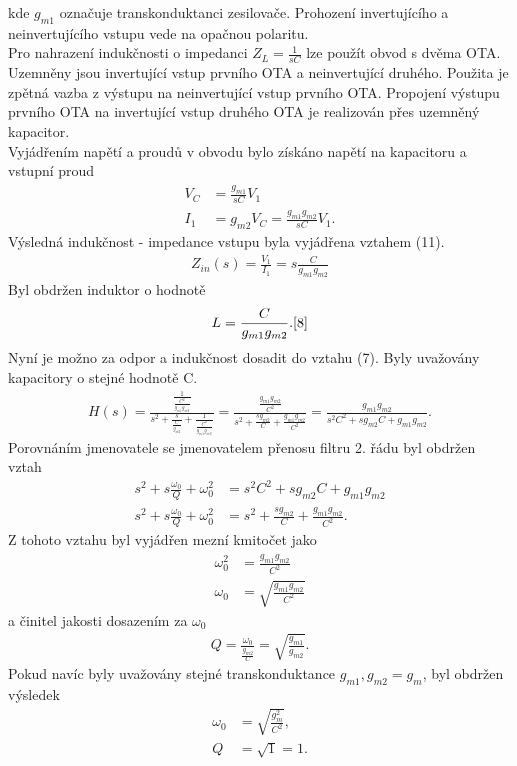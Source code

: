 \documentclass[twoside]{article}
\begin{document}
kde $g_{m1}$ označuje transkonduktanci zesilovače. Prohození invertujícího a neinvertujícího vstupu vede na opačnou polaritu. \cite{8} \\
Pro nahrazení indukčnosti o impedanci $Z_L = \frac{1}{sC}$ lze použít obvod s dvěma OTA. Uzemněny jsou invertující vstup prvního OTA a neinvertující druhého. Použita je zpětná vazba z výstupu na neinvertující vstup prvního OTA. Propojení výstupu prvního OTA na invertující vstup druhého OTA je realizován přes uzemněný kapacitor. \\
Vyjádřením napětí a proudů v obvodu bylo získáno napětí na kapacitoru a vstupní proud
\begin{align}
V_C &= \frac{g_{m1}}{sC}V_1 \\
I_1 &= g_{m2}V_C = \frac{g_{m1}g_{m2}}{sC}V_1.
\end{align}
Výsledná indukčnost - impedance vstupu byla vyjádřena vztahem (11).
\begin{align}
Z_{in}(s) = \frac{V_1}{I_1} = s\frac{C}{g_{m1}g_{m2}}
\end{align}
\noindent Byl obdržen induktor o hodnotě
\begin{align}
L = \frac{C}{g_{m1}g_{m2}}. \cite{8}
\end{align}
\noindent Nyní je možno za odpor a indukčnost dosadit do vztahu (7). Byly uvažovány kapacitory o stejné hodnotě C.
\begin{align}
H(s) = \frac{\frac{1}{\frac{C^2}{g_{m1}g_{m2}}}}{s^2 + \frac{s}{\frac{C}{g_{m2}}} + \frac{1}{\frac{C^2}{g_{m1}g_{m2}}}} = \frac{\frac{g_{m1}g_{m2}}{C^2}}{s^2 + \frac{sg_{m2}}{C} + \frac{g_{m1}g_{m2}}{C^2}} = \frac{g_{m1}g_{m2}}{s^2C^2 + sg_{m2}C + g_{m1}g_{m2}}.
\end{align}
Porovnáním jmenovatele se jmenovatelem přenosu filtru 2. řádu byl obdržen vztah
\begin{align}
s^2 + s\frac{\omega _0}{Q} + \omega _0^2 &= s^2C^2 + sg_{m2}C + g_{m1}g_{m2}\\
s^2 + s\frac{\omega _0}{Q} + \omega _0^2 &= s^2 + \frac{sg_{m2}}{C} + \frac{g_{m1}g_{m2}}{C^2}.
\end{align}
Z tohoto vztahu byl vyjádřen mezní kmitočet jako 
\begin{align}
\omega _0^2 &= \frac{g_{m1}g_{m2}}{C^2} \\
\omega _0 &= \sqrt{\frac{g_{m1}g_{m2}}{C^2}}
\end{align}
a činitel jakosti dosazením za $\omega _0$
\begin{align}
Q = \frac{\omega _0}{\frac{g_{m2}}{C}} = \sqrt{\frac{g_{m1}}{g_{m2}}}.
\end{align}
Pokud navíc byly uvažovány stejné transkonduktance $g_{m1},g_{m2} = g_m$, byl obdržen výsledek
\begin{align}
\omega _0 &= \sqrt{\frac{g_m^2}{C^2}},\\
Q &= \sqrt{1} = 1.
\end{align}
\end{document}
